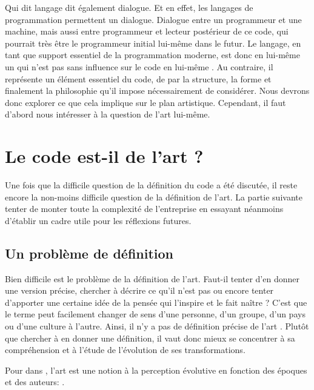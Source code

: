 \documentclass[12pt]{article} %
\begin{document}
Qui dit langage dit également dialogue. Et en effet, les langages de programmation permettent un dialogue. Dialogue entre un programmeur et une machine, mais aussi entre programmeur et lecteur postérieur de ce code, qui pourrait très être le programmeur initial lui-même dans le futur. Le langage, en tant que support essentiel de la programmation moderne, est donc en lui-même un  \cite{GerardBerry2015} qui n'est pas sans influence sur le code en lui-même \cite{Dijkstra1976}. Au contraire, il représente un élément essentiel du code, de par la structure, la forme et finalement la philosophie qu'il impose nécessairement de considérer.  Nous devrons donc explorer ce que cela implique sur le plan artistique. Cependant, il faut d'abord nous intéresser à la question de l'art lui-même.

\section{Le code est-il de l'art ?}
Une fois que la difficile question de la définition du code a été discutée, il reste encore la non-moins difficile question de la définition de l'art. La partie suivante tenter de monter toute la complexité de l'entreprise en essayant néanmoins d'établir un cadre utile pour les réflexions futures.

\subsection{Un problème de définition}
Bien difficile est le problème de la définition de l'art. Faut-il tenter d'en donner une version précise, chercher à décrire ce qu'il n'est pas ou encore tenter d'apporter une certaine idée de la pensée qui l'inspire et le fait naître ? C'est que le terme peut facilement changer de sens d'une personne, d'un groupe, d'un pays ou d'une culture à l'autre. Ainsi, il n'y a pas de définition précise de l'art \cite{SDavies1991}. Plutôt que chercher à en donner une définition, il vaut donc mieux se concentrer à sa compréhension et à l'étude de l'évolution de ses transformations. 

Pour \citeauthor{SDavies1991} dans , l'art est une notion à la perception évolutive en fonction des époques et des auteurs:  \cite{SDavies1991}. 
\end{document}
